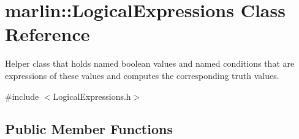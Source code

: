 \section{marlin\+:\+:Logical\+Expressions Class Reference}
\label{classmarlin_1_1LogicalExpressions}


Helper class that holds named boolean values and named conditions that are expressions of these values and computes the corresponding truth values.  




{\ttfamily \#include $<$Logical\+Expressions.\+h$>$}

\subsection*{Public Member Functions}
